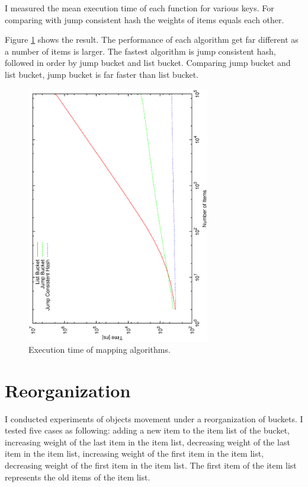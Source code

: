 \documentclass[a4paper,11pt]{article}
\begin{document}
I measured the mean execution time of each function for various keys. For comparing with jump consistent hash the weights of items equals each other.

Figure \ref{performance} shows the result. The performance of each algorithm get far different as a number of items is larger.
The fastest algorithm is jump consistent hash, followed in order by jump bucket and list bucket.
Comparing jump bucket and list bucket, jump bucket is far faster than list bucket.

\begin{figure}[tbp]
  \begin{center}
    \includegraphics[width=80mm, angle=-90]{performance.eps}
  \end{center}
  \caption{Execution time of mapping algorithms.}
  \label{performance}
\end{figure}

\section{Reorganization}

I conducted experiments of objects movement under a reorganization of buckets.
I tested five cases as following: adding a new item to the item list of the bucket, increasing weight of the last item in the item list, decreasing weight of the last item in the item list, increasing weight of the first item in the item list, decreasing weight of the first item in the item list. The first item of the item list represents the old items of the item list.
\end{document}
